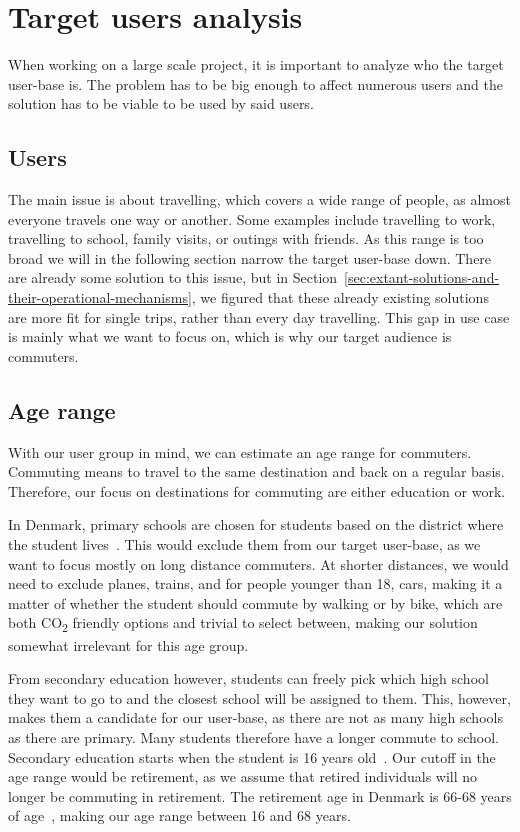 \section{Target users analysis}\label{sec:target-users-analysis}

When working on a large scale project, it is important to analyze who the target user-base is.
The problem has to be big enough to affect numerous users and the solution has to be viable to be used by said
users.

\subsection{Users}\label{subsec:users}

The main issue is about travelling, which covers a wide range of people, as almost everyone travels one way or
another.
Some examples include travelling to work, travelling to school, family visits, or outings with friends.
As this range is too broad we will in the following section narrow the target user-base down.
There are already some solution to this issue, but in Section~\ref{sec:extant-solutions-and-their-operational-mechanisms},
we figured that these already existing solutions are more fit for single trips, rather than every day travelling.
This gap in use case is mainly what we want to focus on, which is why our target audience is commuters.

\subsection{Age range}\label{subsec:age-range}

With our user group in mind, we can estimate an age range for commuters.
Commuting means to travel to the same destination and back on a regular basis.
Therefore, our focus on destinations for commuting are either education or work.

In Denmark, primary schools are chosen for students based on the district where the student lives~\cite{primary_school}.
This would exclude them from our target user-base, as we want to focus mostly on long distance commuters.
At shorter distances, we would need to exclude planes, trains, and for people younger than 18, cars, making it a matter
of whether the student should commute by walking or by bike, which are both \unit{CO_{2}} friendly options and trivial
to select between, making our solution somewhat irrelevant for this age group.

From secondary education however, students can freely pick which high school they want to go to and the closest school
will be assigned to them.
This, however, makes them a candidate for our user-base, as there are not as many high schools as there are primary.
Many students therefore have a longer commute to school.
Secondary education starts when the student is 16 years old~\cite{secondary_school}.
Our cutoff in the age range would be retirement, as we assume that retired individuals will no longer be commuting in
retirement.
The retirement age in Denmark is 66-68 years of age~\cite{retirement}, making our age range between 16 and 68 years.

